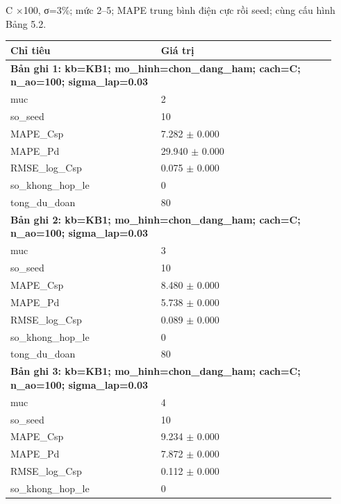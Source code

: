 \par\smallskip\noindent C ×100, σ=3\%; mức 2–5; MAPE trung bình điện cực rồi seed; cùng cấu hình Bảng 5.2.\par
\begin{longtable}{p{0.43\linewidth}p{0.50\linewidth}}
\toprule Chỉ tiêu & Giá trị \\ \midrule \endhead
\multicolumn{2}{p{0.95\linewidth}}{\textbf{Bản ghi 1: kb=KB1; mo\_hinh=chon\_dang\_ham; cach=C; n\_ao=100; sigma\_lap=0.03}} \\
muc & 2 \\
so\_\allowbreak seed & 10 \\
MAPE\_\allowbreak Csp & 7.282 $\pm$ 0.000 \\
MAPE\_\allowbreak Pd & 29.940 $\pm$ 0.000 \\
RMSE\_\allowbreak log\_\allowbreak Csp & 0.075 $\pm$ 0.000 \\
so\_\allowbreak khong\_\allowbreak hop\_\allowbreak le & 0 \\
tong\_\allowbreak du\_\allowbreak doan & 80 \\
\midrule
\multicolumn{2}{p{0.95\linewidth}}{\textbf{Bản ghi 2: kb=KB1; mo\_hinh=chon\_dang\_ham; cach=C; n\_ao=100; sigma\_lap=0.03}} \\
muc & 3 \\
so\_\allowbreak seed & 10 \\
MAPE\_\allowbreak Csp & 8.480 $\pm$ 0.000 \\
MAPE\_\allowbreak Pd & 5.738 $\pm$ 0.000 \\
RMSE\_\allowbreak log\_\allowbreak Csp & 0.089 $\pm$ 0.000 \\
so\_\allowbreak khong\_\allowbreak hop\_\allowbreak le & 0 \\
tong\_\allowbreak du\_\allowbreak doan & 80 \\
\midrule
\multicolumn{2}{p{0.95\linewidth}}{\textbf{Bản ghi 3: kb=KB1; mo\_hinh=chon\_dang\_ham; cach=C; n\_ao=100; sigma\_lap=0.03}} \\
muc & 4 \\
so\_\allowbreak seed & 10 \\
MAPE\_\allowbreak Csp & 9.234 $\pm$ 0.000 \\
MAPE\_\allowbreak Pd & 7.872 $\pm$ 0.000 \\
RMSE\_\allowbreak log\_\allowbreak Csp & 0.112 $\pm$ 0.000 \\
so\_\allowbreak khong\_\allowbreak hop\_\allowbreak le & 0 \\

\end{longtable}
